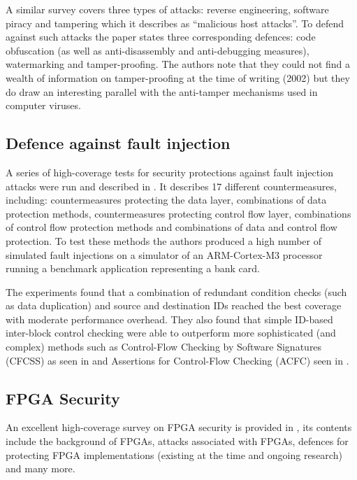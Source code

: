 A similar survey \cite{Collberg2002} covers three types of attacks: reverse engineering, software piracy and tampering which it describes as ``malicious host attacks''. To defend against such attacks the paper states three corresponding defences: code obfuscation (as well as anti-disassembly and anti-debugging measures), watermarking and tamper-proofing. The authors note that they could not find a wealth of information on tamper-proofing at the time of writing (2002) but they do draw an interesting parallel with the anti-tamper mechanisms used in computer viruses.  

\subsection{Defence against fault injection}\label{faultInjectionDefenceSurveys}

A series of high-coverage tests for security protections against fault injection attacks were run and described in \cite{Theissing2013}. It describes 17 different countermeasures, including: countermeasures protecting the data layer, combinations of data protection methods, countermeasures protecting control flow layer, combinations of control flow protection methods and combinations of data and control flow protection. To test these methods the authors produced a high number of simulated fault injections on a simulator of an ARM-Cortex-M3 processor running a benchmark application representing a bank card.

The experiments found that a combination of redundant condition checks (such as data duplication) and source and destination IDs reached the best coverage with moderate performance overhead. They also found that simple ID-based inter-block control checking were able to outperform more sophisticated (and complex) methods such as Control-Flow Checking by Software Signatures (CFCSS) as seen in \cite{Werner2016} and Assertions for Control-Flow Checking (ACFC) seen in \cite{Goloubeva2003}.

\subsection{FPGA Security}

An excellent high-coverage survey on FPGA security is provided in \cite{Drimer2008}, its contents include the background of FPGAs, attacks associated with FPGAs, defences for protecting FPGA implementations (existing at the time and ongoing research) and many more. 

